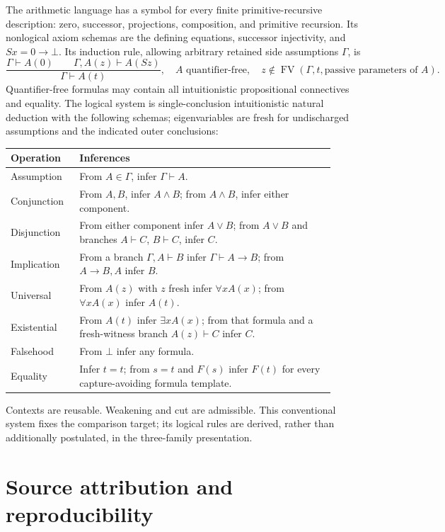 \documentclass[11pt]{article}
\theoremstyle{definition}\newtheorem{definition}[theorem]{Definition}
\theoremstyle{remark}\newtheorem{remark}[theorem]{Remark}
\newcommand{\FV}{\operatorname{FV}}
\begin{document}
The arithmetic language has a symbol for every finite primitive-recursive
description: zero, successor, projections, composition, and primitive
recursion. Its nonlogical axiom schemas are the defining equations,
successor injectivity, and $Sx=0\to\bot$. Its induction rule, allowing
arbitrary retained side assumptions $\Gamma$, is
\[
 \frac{\Gamma\vdash A(0)\qquad\Gamma,A(z)\vdash A(Sz)}
      {\Gamma\vdash A(t)},
 \quad A\text{ quantifier-free},\quad
 z\notin\FV(\Gamma,t,\text{passive parameters of }A).
\]
Quantifier-free formulas may contain all intuitionistic propositional
connectives and equality. The logical system is single-conclusion
intuitionistic natural deduction with the following schemas; eigenvariables
are fresh for undischarged assumptions and the indicated outer conclusions:
\begin{center}
\begin{tabular}{p{0.19\linewidth}p{0.72\linewidth}}
\toprule
Operation & Inferences\\
\midrule
Assumption & From $A\in\Gamma$, infer $\Gamma\vdash A$.\\[2pt]
Conjunction & From $A,B$, infer $A\land B$; from $A\land B$, infer either component.\\[2pt]
Disjunction & From either component infer $A\lor B$; from $A\lor B$ and branches $A\vdash C$, $B\vdash C$, infer $C$.\\[2pt]
Implication & From a branch $\Gamma,A\vdash B$ infer $\Gamma\vdash A\to B$; from $A\to B,A$ infer $B$.\\[2pt]
Universal & From $A(z)$ with $z$ fresh infer $\forall x A(x)$; from $\forall x A(x)$ infer $A(t)$.\\[2pt]
Existential & From $A(t)$ infer $\exists x A(x)$; from that formula and a fresh-witness branch $A(z)\vdash C$ infer $C$.\\[2pt]
Falsehood & From $\bot$ infer any formula.\\[2pt]
Equality & Infer $t=t$; from $s=t$ and $F(s)$ infer $F(t)$ for every capture-avoiding formula template.\\
\bottomrule
\end{tabular}
\end{center}
Contexts are reusable. Weakening and cut are admissible. This conventional
system fixes the comparison target; its logical rules are derived, rather
than additionally postulated, in the three-family presentation.

\section{Source attribution and reproducibility}
\end{document}
